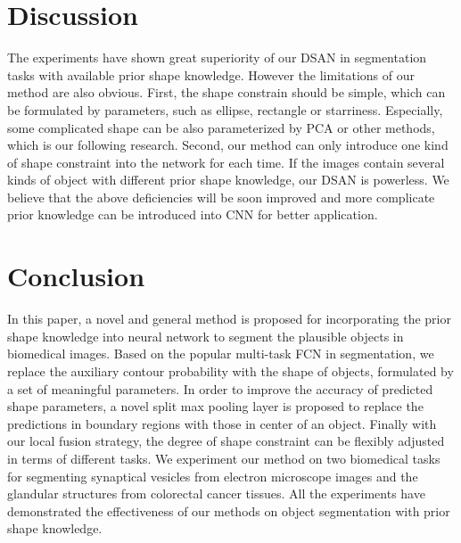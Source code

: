 
\section{Discussion}
The experiments have shown great superiority of our DSAN in segmentation tasks with available prior shape knowledge.
However the limitations of our method are also obvious.
First, the shape constrain should be simple, which can be formulated by parameters, such as ellipse, rectangle or starriness.
Especially, some complicated shape can be also parameterized by PCA or other methods, which is our following research.
Second, our method can only introduce one kind of shape constraint into the network for each time.
If the images contain several kinds of object with different prior shape knowledge, our DSAN is powerless.
We believe that the above deficiencies will be soon improved and more complicate prior knowledge can be introduced into CNN for better application. 

\section{Conclusion}
In this paper, a novel and general method is proposed for incorporating the prior shape knowledge into neural network to segment the plausible objects in biomedical images.
Based on the popular multi-task FCN in segmentation, we replace the auxiliary contour probability with the shape of objects, formulated by a set of meaningful parameters.
In order to improve the accuracy of predicted shape parameters, a novel split max pooling layer is proposed to replace the predictions in boundary regions with those in center of an object.
Finally with our local fusion strategy, the degree of shape constraint can be flexibly adjusted in terms of different tasks.
We experiment our method on two biomedical tasks for segmenting synaptical vesicles from electron microscope images and the glandular structures from colorectal cancer tissues.
All the experiments have demonstrated the effectiveness of our methods on object segmentation with prior shape knowledge.
